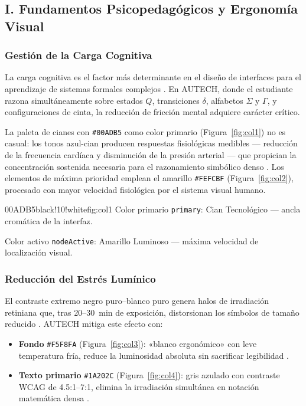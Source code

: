 \subsection*{\texorpdfstring{I.\;}{I.} Fundamentos Psicopedagógicos y Ergonomía Visual}

\subsubsection*{Gestión de la Carga Cognitiva}

La carga cognitiva es el factor más determinante en el diseño de interfaces para el aprendizaje de
sistemas formales complejos \cite{lidwell2010}. En AUTECH, donde el estudiante razona
simultáneamente sobre estados $Q$, transiciones $\delta$, alfabetos $\Sigma$ y $\Gamma$, y
configuraciones de cinta, la reducción de fricción mental adquiere carácter crítico.

La paleta de cianes con \texttt{\#00ADB5} como color primario (Figura~\ref{fig:col1}) no es
casual: los tonos azul-cian producen respuestas fisiológicas medibles — reducción de la frecuencia
cardíaca y disminución de la presión arterial — que propician la concentración sostenida necesaria
para el razonamiento simbólico denso \cite{heller2004}. Los elementos de máxima prioridad emplean
el amarillo \texttt{\#FEFCBF} (Figura~\ref{fig:col2}), procesado con mayor velocidad fisiológica
por el sistema visual humano.

   {00ADB5}{black!10!white}{fig:col1}%
  {Color primario \texttt{primary}: Cian Tecnológico — ancla cromática de la interfaz.}

%
  {Color activo \texttt{nodeActive}: Amarillo Luminoso — máxima velocidad de localización visual.}

\subsubsection*{Reducción del Estrés Lumínico}

El contraste extremo negro puro–blanco puro genera halos de irradiación retiniana que, tras
20--30~min de exposición, distorsionan los símbolos de tamaño reducido \cite{holtzschue2017}.
AUTECH mitiga este efecto con:
\begin{itemize}
  \item \textbf{Fondo} \texttt{\#F5F8FA} (Figura~\ref{fig:col3}): «blanco ergonómico» con leve
        temperatura fría, reduce la luminosidad absoluta sin sacrificar legibilidad
        \cite{holtzschue2017}.
  \item \textbf{Texto primario} \texttt{\#1A202C} (Figura~\ref{fig:col4}): gris azulado con
        contraste WCAG de 4.5:1–7:1, elimina la irradiación simultánea en notación matemática
        densa \cite{lidwell2010}.
\end{itemize}

